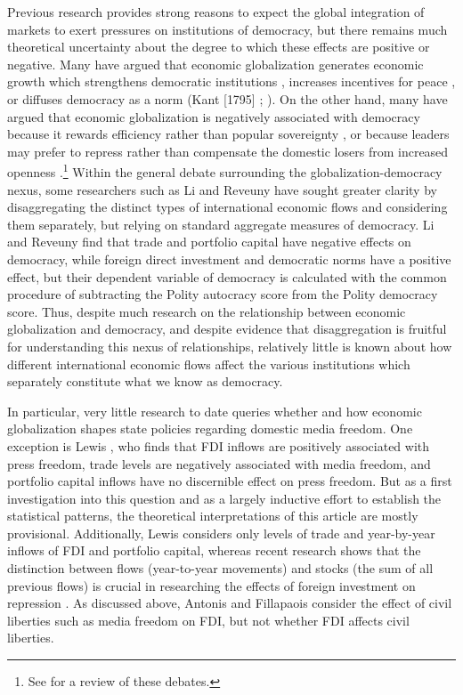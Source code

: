 \documentclass[12pt,a4paper]{article}\usepackage[]{graphicx}\usepackage[]{color}
\begin{document}
Previous research provides strong reasons to expect the global integration of markets to exert pressures on institutions of democracy, but there remains much theoretical uncertainty about the degree to which these effects are positive or negative. Many have argued that economic globalization generates economic growth which strengthens democratic institutions \parencites{Baghwati:1997vy}{Im:1996cl}, increases incentives for peace \parencites{Baghwati:1997vy}{Oneal:1999fc}, or diffuses democracy as a norm (Kant [1795] \cite*{Kant:1983uf}; \cite{Limongi:1996dr}). On the other hand, many have argued that economic globalization is negatively associated with democracy because it rewards efficiency rather than popular sovereignty \parencites{Huntington:1975vt}{Lindblom:1977ue}{Cammack:1998gf}, or because leaders may prefer to repress rather than compensate the domestic losers from increased openness \parencite{Adsera:2002vt}.\footnote{See \cite{Milner:2009hi} for a review of these debates.} Within the general debate surrounding the globalization-democracy nexus, some researchers such as Li and Reveuny \parencite*{Li:2003vj} have sought greater clarity by disaggregating the distinct types of international economic flows and considering them separately, but relying on standard aggregate measures of democracy. Li and Reveuny find that trade and portfolio capital have negative effects on democracy, while foreign direct investment and democratic norms have a positive effect, but their dependent variable of democracy is calculated with the common procedure of subtracting the Polity autocracy score from the Polity democracy score. Thus, despite much research on the relationship between economic globalization and democracy, and despite evidence that disaggregation is fruitful for understanding this nexus of relationships, relatively little is known about how different international economic flows affect the various institutions which separately constitute what we know as democracy.

In particular, very little research to date queries whether and how economic globalization shapes state policies regarding domestic media freedom. One exception is Lewis \parencite*{Lewis:qDvYbWlU}, who finds that FDI inflows are positively associated with press freedom, trade levels are negatively associated with media freedom, and portfolio capital inflows have no discernible effect on press freedom. But as a first investigation into this question and as a largely inductive effort to establish the statistical patterns, the theoretical interpretations of this article are mostly provisional. Additionally, Lewis considers only levels of trade and year-by-year inflows of FDI and portfolio capital, whereas recent research shows that the distinction between flows (year-to-year movements) and stocks (the sum of all previous flows) is crucial in researching the effects of foreign investment on repression \parencite{Sorens:2012hc}. As discussed above, Antonis and Fillapaois \parencite*{Adam:2007gn} consider the effect of civil liberties such as media freedom on FDI, but not whether FDI affects civil liberties.
\end{document}
